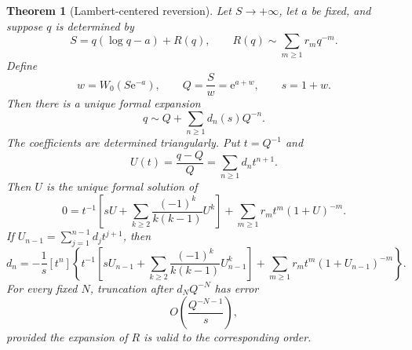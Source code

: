 \documentclass[11pt]{article}
\numberwithin{equation}{section}
\theoremstyle{mainthm}
\newtheorem{theorem}{Theorem}[section]
\theoremstyle{defstyle}
\theoremstyle{remark}
\newcommand{\e}{\mathrm e}
\begin{document}
\begin{theorem}[Lambert-centered reversion]\label{thm:lambert-centered-reversion}
Let \(S\to+\infty\), let \(a\) be fixed, and suppose \(q\) is determined by
\begin{equation}\label{eq:general-lambert-shape}
 S=q(\log q-a)+R(q),
 \qquad
 R(q)\sim\sum_{m\ge1}r_m q^{-m}.
\end{equation}
Define
\begin{equation}\label{eq:general-carrier}
 w=W_0(S\e^{-a}),
 \qquad Q=\frac{S}{w}=\e^{a+w},
 \qquad s=1+w.
\end{equation}
Then there is a unique formal expansion
\begin{equation}\label{eq:q-reversion-general}
 q\sim Q+\sum_{n\ge1}d_n(s)Q^{-n}.
\end{equation}
The coefficients are determined triangularly.  Put \(t=Q^{-1}\) and
\begin{equation}\label{eq:U-def}
 U(t)=\frac{q-Q}{Q}=\sum_{n\ge1}d_n t^{n+1}.
\end{equation}
Then \(U\) is the unique formal solution of
\begin{equation}\label{eq:U-master-equation}
 0=t^{-1}\left[
 sU+\sum_{k\ge2}\frac{(-1)^k}{k(k-1)}U^k
 \right]
 +\sum_{m\ge1}r_m t^m(1+U)^{-m}.
\end{equation}
If \(U_{n-1}=\sum_{j=1}^{n-1}d_jt^{j+1}\), then
\begin{equation}\label{eq:d-recursion}
 d_n=-\frac1s[t^n]\left\{
 t^{-1}\left[sU_{n-1}+\sum_{k\ge2}\frac{(-1)^k}{k(k-1)}U_{n-1}^k\right]
 +\sum_{m\ge1}r_mt^m(1+U_{n-1})^{-m}
 \right\}.
\end{equation}
For every fixed \(N\), truncation after \(d_NQ^{-N}\) has error
\begin{equation}\label{eq:lambert-reversion-error}
 O\!\left(\frac{Q^{-N-1}}{s}\right),
\end{equation}
provided the expansion of \(R\) is valid to the corresponding order.
\end{theorem}
\end{document}
